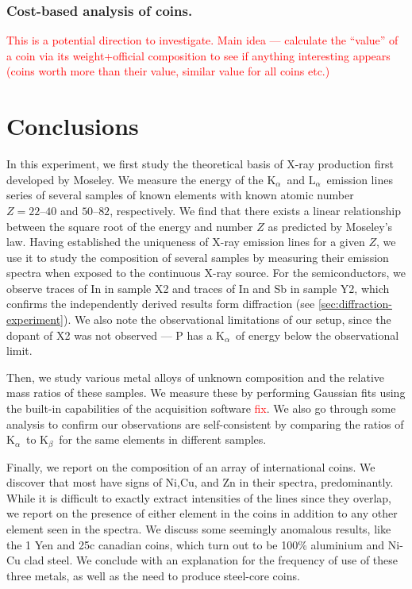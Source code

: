 \documentclass[11pt,a4paper,twoside,onecolumn]{article}
\newcommand{\reminder}[1]{\textcolor{red}{#1}}
\newcommand{\Kalpha}{$\mathrm{K}_\alpha$~}
\newcommand{\Kbeta}{$\mathrm{K}_\beta$~}
\newcommand{\Lalpha}{$\mathrm{L}_\alpha$~}
\begin{document}
\subsubsection{Cost-based analysis of coins.}
\reminder{This is a potential direction to investigate. Main idea --- calculate the ``value'' of a coin via its weight+official composition to see if anything interesting appears (coins worth more than their value, similar value for all coins etc.)}

\section{Conclusions}
In this experiment, we first study the theoretical basis of X-ray production first developed by Moseley. We measure the energy of the \Kalpha and \Lalpha emission lines series of several samples of known elements with known atomic number $Z=\numrange{22}{40}$ and $\numrange{50}{82}$, respectively. We find that there exists a linear relationship between the square root of the energy and number $Z$ as predicted by Moseley's law. Having established the uniqueness of X-ray emission lines for a given $Z$, we use it to study the composition of several samples by measuring their emission spectra when exposed to the continuous X-ray source. For the semiconductors, we observe traces of In in sample X2 and traces of In and Sb in sample Y2, which confirms the independently derived results form diffraction (see \ref{sec:diffraction-experiment}). We also note the observational limitations of our setup, since the dopant of X2 was not observed --- P has a \Kalpha of energy below the observational limit.

Then, we study various metal alloys of unknown composition and the relative mass ratios of these samples. We measure these by performing Gaussian fits using the built-in capabilities of the acquisition software \reminder{fix}. We also go through some analysis to confirm our observations are self-consistent by comparing the ratios of \Kalpha to \Kbeta for the same elements in different samples.

Finally, we report on the composition of an array of international coins. We discover that most have signs of Ni,Cu, and Zn in their spectra, predominantly. While it is difficult to exactly extract intensities of the lines since they overlap, we report on the presence of either element in the coins in addition to any other element seen in the spectra. We discuss some seemingly anomalous results, like the 1 Yen and 25c canadian coins, which turn out to be 100\% aluminium and Ni-Cu clad steel. We conclude with an explanation for the frequency of use of these three metals, as well as the need to produce steel-core coins.
\end{document}
